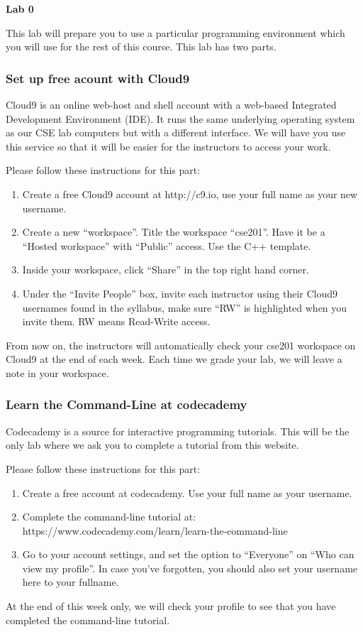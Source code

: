 \documentclass[a4paper,12pt]{article}
\begin{document}
{\centering \Large \bf
Lab 0 \\[\baselineskip]
}

This lab will prepare you to use a particular programming environment which you will use for the rest of this course. This lab has two parts.

\subsubsection*{Set up free acount with Cloud9}

Cloud9 is an online web-host and shell account with a web-based Integrated Development Environment (IDE). It runs the same underlying operating system as our CSE lab computers but with a different interface. We will have you use this service so that it will be easier for the instructors to access your work. 

Please follow these instructions for this part:
\begin{enumerate}
\item Create a free Cloud9 account at http://c9.io, use your full name as your new username.
\item Create a new ``workspace''. Title the workspace ``cse201''. Have it be a ``Hosted workspace'' with ``Public'' access. Use the C++ template.
\item Inside your workspace, click ``Share'' in the top right hand corner. 
\item Under the ``Invite People'' box, invite each instructor using their Cloud9 usernames found in the syllabus, make sure ``RW'' is highlighted when you invite them. RW means Read-Write access.
\end{enumerate}

From now on, the instructors will automatically check your cse201 workspace on Cloud9 at the end of each week. Each time we grade your lab, we will leave a note in your workspace.

\subsubsection*{Learn the Command-Line at codecademy}

Codecademy is a source for interactive programming tutorials. This will be the only lab where we ask you to complete a tutorial from this website. 

Please follow these instructions for this part:
\begin{enumerate}
\item Create a free account at codecademy. Use your full name as your username. 
\item Complete the command-line tutorial at: https://www.codecademy.com/learn/learn-the-command-line
\item Go to your account settings, and set the option to ``Everyone'' on ``Who can view my profile''. In case you've forgotten, you should also set your username here to your fullname.
\end{enumerate}

At the end of this week only, we will check your profile to see that you have completed the command-line tutorial.
\end{document}

